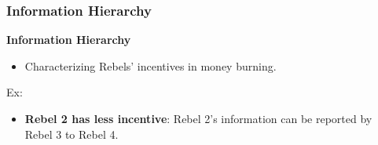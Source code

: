 \documentclass[9pt]{beamer}
\begin{document}
\begin{frame}
   \frametitle{Information Hierarchy}


\textbf{Information Hierarchy}
\begin{itemize}
\item {Characterizing Rebels' incentives in money burning.}\hyperlink{alt_IH}{}
\end{itemize}

Ex: 
\begin{center}
\end{center}

\pause
\begin{itemize}
\item \textbf{Rebel 2 has less incentive}: Rebel 2's information can be reported by Rebel 3 to Rebel 4.
\end{itemize}



\end{frame}
\end{document}
